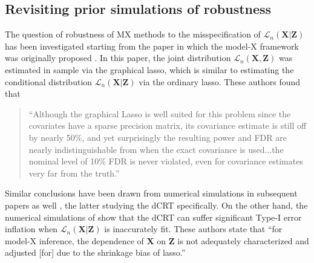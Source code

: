 \documentclass[12pt]{article}
\theoremstyle{definition}
\theoremstyle{remark}
\newcommand{\prx}{\bm X}								%
\newcommand{\prz}{\bm Z}								%
\newcommand{\law}{\mathcal L}							%
\begin{document}
	\subsection{Revisiting prior simulations of robustness}  \label{sec:sim-revisiting}
	
	The question of robustness of MX methods to the misspecification of $\law_n(\prx|\prz)$ has been investigated starting from the paper in which the model-X framework was originally proposed \citep{CetL16}. In this paper, the joint distribution $\law_n(\prx,\prz)$ was estimated in sample via the graphical lasso, which is similar to estimating the conditional distribution $\law_n(\prx|\prz)$ via the ordinary lasso. These authors found that
	\begin{quote}
		``Although the graphical Lasso is well suited for this problem since the covariates have a sparse precision matrix, its covariance estimate is still off by nearly 50\%, and yet surprisingly the resulting power and FDR are nearly indistinguishable from when the exact covariance is used...the nominal level of 10\% FDR is never violated, even for covariance estimates very far from the truth.''
	\end{quote}
	Similar conclusions have been drawn from numerical simulations in subsequent papers as well \citep{SetC17, Romano2019a, SetS19, Liu2022a}, the latter studying the dCRT specifically. On the other hand, the numerical simulations of \citet{Li2022} show that the dCRT can suffer significant Type-I error inflation when $\law_n(\prx|\prz)$ is inaccurately fit. These authors state that ``for model-X inference, the dependence of $\prx$ on $\prz$ is not adequately characterized and adjusted [for] due to the shrinkage bias of lasso.''
	
\end{document}
